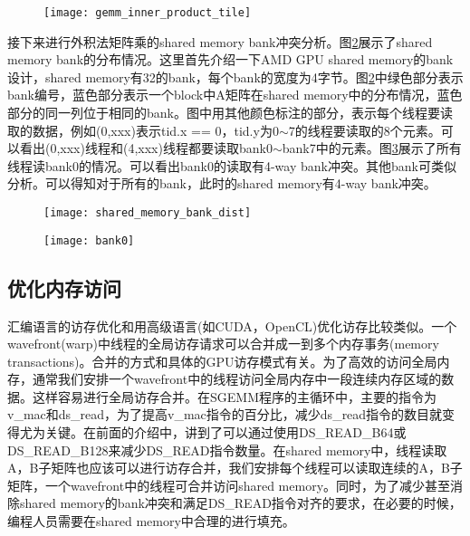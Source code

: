 \begin{figure}[htbp]
	\centering
	\texttt{[image: gemm\_inner\_product\_tile]}
	\label{fig:gemm_inner_product_tile}
\end{figure}

接下来进行外积法矩阵乘的shared memory bank冲突分析。图\ref{fig:shared_memory_bank_dist}展示了shared memory bank的分布情况。这里首先介绍一下AMD GPU shared memory的bank设计，shared memory有32的bank，每个bank的宽度为4字节。图\ref{fig:shared_memory_bank_dist}中绿色部分表示bank编号，蓝色部分表示一个block中A矩阵在shared memory中的分布情况，蓝色部分的同一列位于相同的bank。图中用其他颜色标注的部分，表示每个线程要读取的数据，例如(0,xxx)表示tid.x == 0，tid.y为0$\sim$7的线程要读取的8个元素。可以看出(0,xxx)线程和(4,xxx)线程都要读取bank0$\sim$bank7中的元素。图\ref{fig:bank0}展示了所有线程读bank0的情况。可以看出bank0的读取有4-way bank冲突。其他bank可类似分析。可以得知对于所有的bank，此时的shared memory有4-way bank冲突。



\begin{figure}[htbp]
	\centering
	\texttt{[image: shared\_memory\_bank\_dist]}
	\label{fig:shared_memory_bank_dist}
\end{figure}

\begin{figure}[htbp]
	\centering
	\texttt{[image: bank0]}
	\label{fig:bank0}
\end{figure}

\subsection{优化内存访问}
汇编语言的访存优化和用高级语言(如CUDA，OpenCL)优化访存比较类似。一个wavefront(warp)中线程的全局访存请求可以合并成一到多个内存事务(memory transactions)。合并的方式和具体的GPU访存模式有关。为了高效的访问全局内存，通常我们安排一个wavefront中的线程访问全局内存中一段连续内存区域的数据。这样容易进行全局访存合并。在SGEMM程序的主循环中，主要的指令为v\_mac和ds\_read，为了提高v\_mac指令的百分比，减少ds\_read指令的数目就变得尤为关键。在前面的介绍中，讲到了可以通过使用DS\_READ\_B64或DS\_READ\_B128来减少DS\_READ指令数量。在shared memory中，线程读取A，B子矩阵也应该可以进行访存合并，我们安排每个线程可以读取连续的A，B子矩阵，一个wavefront中的线程可合并访问shared memory。同时，为了减少甚至消除shared memory的bank冲突和满足DS\_READ指令对齐的要求，在必要的时候，编程人员需要在shared memory中合理的进行填充。


